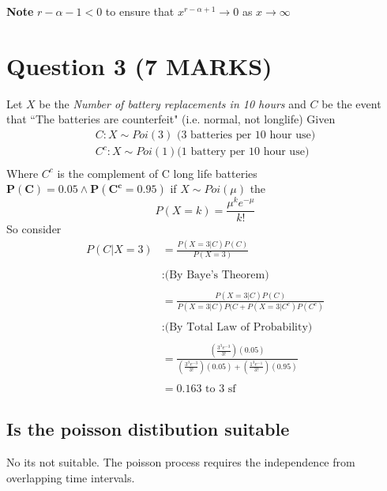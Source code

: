 \documentclass[11pt]{article}
\begin{document}
\textbf{Note} $r-\alpha-1 <0$ to ensure that $x^{r-\alpha+1} \to 0$ as $x \to \infty$
\section{Question 3 (7 MARKS)}
Let $X$ be the \emph{Number of battery replacements in 10 hours} and $C$ be the event that ``The batteries are counterfeit" (i.e. normal, not longlife)
Given
\begin{align*}
    C: X \sim Poi(3) \text{ (3 batteries per 10 hour use)}\\
    C^{c}: X \sim Poi(1) \text{(1 battery per 10 hour use)} \\
\end{align*}
Where $C^{c}$ is the complement of C long life batteries $\bm{P(C)=0.05 \land P(C^{c}=0.95)}$
if $X \sim Poi(\mu)$ the
\begin{equation*}
    P(X=k)= \frac{\mu^{k}e^{-\mu}}{k!}
\end{equation*}
So consider
\begin{align*}
    P(C | X=3) &= \frac{P(X=3|C)P(C)}{P(X=3)} \\ \\
               &:  \text{(By Baye's Theorem)} \\ \\
               &= \frac{P(X=3|C)P(C)}{P(X=3|C)P(C + P(X=3|C^{c})P(C^{c})} \\ \\
               &:  \text{(By Total Law of Probability)} \\ \\
               &= \frac{\left(\frac{3^{3}e^{-3}}{3!} \right)(0.05)}{\left(\frac{3^{3}e^{-3}}{3!} \right)(0.05) +\left(\frac{1^{3}e^{-1}}{3!} \right)(0.95)} \\ \\
               &= \boxed{0.163 \text{ to 3 sf}}
\end{align*}
\subsection{Is the poisson distibution suitable}
No its not suitable. The poisson process requires the independence from overlapping time intervals.
\end{document}
